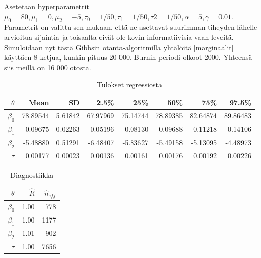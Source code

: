 Asetetaan hyperparametrit $\mu_0 = 80,\mu_1 = 0, \mu_2 = -5, \tau_0 = 1/50, \tau_1 = 1/50, \tau2 = 1/50, \alpha	= 5, \gamma = 0.01$. Parametrit on valittu sen mukaan, että ne asettavat suurimman tiheyden lähelle arvioitua sijaintia ja toisaalta eivät ole kovin informatiivisia vaan leveitä. Simuloidaan nyt tästä Gibbsin otanta-algoritmilla yhtälöitä \ref{marginaalit} käyttäen 8 ketjua, kunkin pituus 20 000. Burnin-periodi olkoot 2000. Yhteensä siis meillä on  16 000 otosta.

\begin{table}[ht]
\centering
\label{results}
\begin{tabular}{rrrrrrrr}
  \hline
 $\theta$ & Mean & SD & 2.5\% & 25\% & 50\% & 75\% & 97.5\% \\ 
  \hline
  $\beta_0$ & 78.89544 & 5.61842 & 67.97969 & 75.14744 & 78.89385 & 82.64874 & 89.86483 \\ 
  $\beta_1$ & 0.09675 & 0.02263 & 0.05196 & 0.08130 & 0.09688 & 0.11218 & 0.14106 \\ 
  $\beta_2$ & -5.48880 & 0.51291 & -6.48407 & -5.83627 & -5.49158 & -5.13095 & -4.48973 \\ 
  $\tau$ & 0.00177 & 0.00023 & 0.00136 & 0.00161 & 0.00176 & 0.00192 & 0.00226 \\ 
   \hline
\end{tabular}
\caption{Tulokset regressiosta}
\end{table}
\begin{table}[ht]\label{diagnostics}
\centering
\begin{tabular}{rrr}
  \hline
 $\theta$ & $\hat{R}$ & $\hat{n}_{eff}$ \\ 
  \hline
  $\beta_0$ & 1.00 & 778 \\ 
  $\beta_1$ & 1.00 & 1177 \\ 
  $\beta_2$ & 1.01 & 902  \\ 
  $\tau$ & 1.00 & 7656  \\ 
   \hline
\end{tabular}
\caption{Diagnostiikka}
\end{table}

